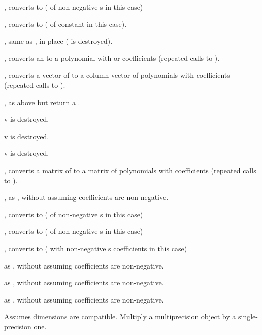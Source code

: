 , converts to  ( of non-negative
s in this case)

, converts to  ( of constant
 in this case).

, same as , in place
( is destroyed).

, converts an  to a polynomial with
 or  coefficients (repeated calls to ).

, converts a vector of  to a column
vector of polynomials with  coefficients (repeated calls to
).

, as above but return a .

 v is destroyed.

 v is destroyed.

 v is destroyed.

, converts a matrix of  to a matrix of
polynomials with  coefficients (repeated calls to ).

, as , without assuming
coefficients are non-negative.

, converts to  ( of non-negative
s in this case)

, converts to  ( of non-negative
s in this case)

, converts to  ( with
non-negative s coefficients in this case)

 as , without assuming
coefficients are non-negative.

 as , without assuming
coefficients are non-negative.

 as , without assuming
coefficients are non-negative.



 Assumes dimensions are compatible.
Multiply a multiprecision object by a single-precision one.

